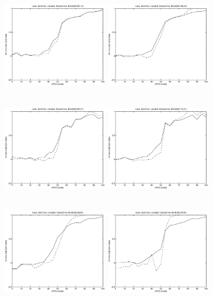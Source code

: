 \documentclass[12pt]{article}
\begin{document}
  

\pagestyle{empty}

\begin{figure}[p]
	\includegraphics[height=4.5cm,width=4.5cm]{bruynplot3.eps}
	\includegraphics[height=4.5cm,width=4.5cm]{bruynplot5.eps}
	\includegraphics[height=4.5cm,width=4.5cm]{bruynplot7.eps}
	\includegraphics[height=4.5cm,width=4.5cm]{bruynplot9.eps}
	\includegraphics[height=4.5cm,width=4.5cm]{bruynplot11.eps}
	\includegraphics[height=4.5cm,width=4.5cm]{bruynplot13.eps}
	

\end{figure}
\end{document}
